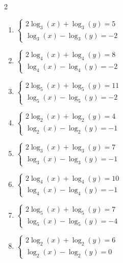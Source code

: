 \documentclass[12pt,a4paper]{article}
\begin{document}
\begin{multicols}{2}
\begin{enumerate}[leftmargin=*, itemsep=6pt]
\item \(\begin{cases} 2\log_{3}\left(x\right)+\log_{3}\left(y\right)=5\\ \log_{3}\left(x\right)-\log_{3}\left(y\right)=-2\end{cases}\)

\item \(\begin{cases} 2\log_{4}\left(x\right)+\log_{4}\left(y\right)=8\\ \log_{4}\left(x\right)-\log_{4}\left(y\right)=-2\end{cases}\)

\item \(\begin{cases} 2\log_{5}\left(x\right)+\log_{5}\left(y\right)=11\\ \log_{5}\left(x\right)-\log_{5}\left(y\right)=-2\end{cases}\)

\item \(\begin{cases} 2\log_{2}\left(x\right)+\log_{2}\left(y\right)=4\\ \log_{2}\left(x\right)-\log_{2}\left(y\right)=-1\end{cases}\)

\item \(\begin{cases} 2\log_{3}\left(x\right)+\log_{3}\left(y\right)=7\\ \log_{3}\left(x\right)-\log_{3}\left(y\right)=-1\end{cases}\)

\item \(\begin{cases} 2\log_{4}\left(x\right)+\log_{4}\left(y\right)=10\\ \log_{4}\left(x\right)-\log_{4}\left(y\right)=-1\end{cases}\)

\item \(\begin{cases} 2\log_{5}\left(x\right)+\log_{5}\left(y\right)=7\\ \log_{5}\left(x\right)-\log_{5}\left(y\right)=-4\end{cases}\)

\item \(\begin{cases} 2\log_{2}\left(x\right)+\log_{2}\left(y\right)=6\\ \log_{2}\left(x\right)-\log_{2}\left(y\right)=0\end{cases}\)


\end{enumerate}
\end{multicols}
\end{document}
